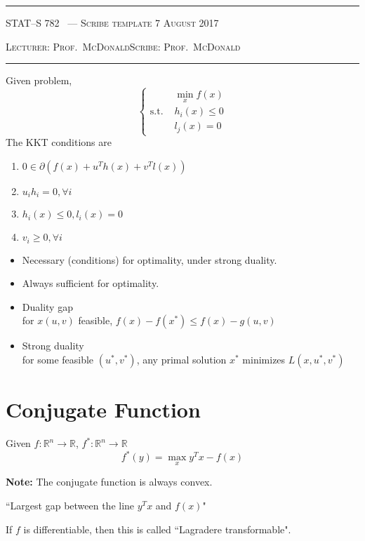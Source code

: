 \documentclass[10pt]{article}
\newcounter{lecnum}
\newcommand{\lecturer}{Prof.\ McDonald}
\newcommand{\scribe}{Prof.\ McDonald}
\newcommand{\chtitle}{Scribe template}
\newcommand{\lecdate}{7 August 2017}
\begin{document}
\rule{6.5in}{1pt}

\textsc{STAT--S 782
        \hfill \thelecnum\ --- \chtitle
        \hfill \lecdate}

\textsc{Lecturer: \lecturer \hfill Scribe: \scribe}
\rule{6.5in}{1pt}

Given problem,
\begin{equation}
\left\{
\begin{array}{lll}
&\min\limits_x f(x)\\
\text{s.t. } &h_i(x) \le 0\\
&l_j(x) = 0
\end{array}
\right.
\end{equation}
The KKT conditions are
\begin{enumerate}
\item $0 \in \partial(f(x) + u^Th(x) + v^T l(x))$
\item $u_i h_i = 0, \forall i$
\item $h_i(x) \le 0, l_i(x) = 0$
\item $v_i \ge 0, \forall i$
\end{enumerate}

\begin{itemize}
\item Necessary (conditions) for optimality, under strong duality.
\item Always sufficient for optimality.
\item Duality gap\\
for $x (u,v)$ feasible, $f(x) - f(x^*) \le f(x) - g(u,v)$
\item Strong duality\\
for some feasible $(u^*, v^*)$, any primal solution $x^*$ minimizes $L(x,u^*,v^*)$
\end{itemize}


\section{Conjugate Function}

Given $f: \mathbb{R}^n \rightarrow \mathbb{R}$, $f^*: \mathbb{R}^n \rightarrow \mathbb{R}$
\begin{equation}
f^*(y) = \max\limits_x y^T x - f(x)
\end{equation}


\textbf{Note:} The conjugate function is always convex.

``Largest gap between the line $y^T x$ and $f(x)$"

If $f$ is differentiable, then this is called ``Lagradere transformable".
\end{document}
